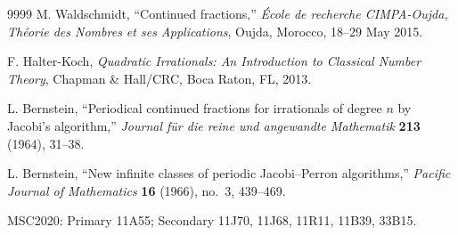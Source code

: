\documentclass[]{interact}
\theoremstyle{plain}
\numberwithin{equation}{section} %
\numberwithin{table}{section} %
\numberwithin{figure}{section}
\begin{document}
\begin{thebibliography}{9999}
M. Waldschmidt,
``Continued fractions,''
\emph{\'Ecole de recherche CIMPA-Oujda, Th\'eorie des Nombres et ses Applications},
Oujda, Morocco, 18--29 May 2015.

F. Halter-Koch,
\emph{Quadratic Irrationals: An Introduction to Classical Number Theory},
Chapman \& Hall/CRC, Boca Raton, FL, 2013.

L. Bernstein,
``Periodical continued fractions for irrationals of degree $n$ by Jacobi's algorithm,''
\emph{Journal f\"ur die reine und angewandte Mathematik} \textbf{213} (1964), 31--38.

L. Bernstein,
``New infinite classes of periodic Jacobi--Perron algorithms,''
\emph{Pacific Journal of Mathematics} \textbf{16} (1966), no.~3, 439--469.

\end{thebibliography}

\medskip
\noindent MSC2020: Primary 11A55; Secondary 11J70, 11J68, 11R11, 11B39, 33B15.

\end{document}
